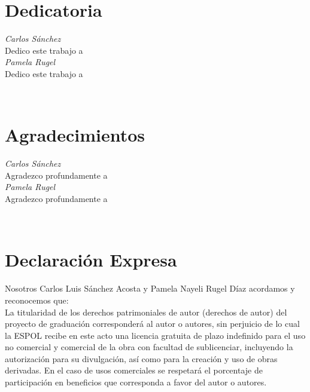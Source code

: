 \chapter*{Dedicatoria}
\thispagestyle{empty}
\begin{flushright}
    \begin{minipage}{.45\linewidth}
    \raggedright
        \textit{Carlos Sánchez}\\
        Dedico este trabajo a 
        \\[3.0em]
        
        \textit{Pamela Rugel}\\
       Dedico este trabajo a 
        
    \end{minipage}
\end{flushright}

$\ $
\thispagestyle{empty}


\chapter*{Agradecimientos}
\thispagestyle{empty}
\begin{flushright}
    \begin{minipage}{.45\linewidth}
    \raggedright
        \textit{Carlos Sánchez}\\
        Agradezco profundamente a 
        \\[3.0em]
        
        \textit{Pamela Rugel}\\
        Agradezco profundamente a 
    \end{minipage}
\end{flushright}

$\ $
\thispagestyle{empty}


\chapter*{Declaración Expresa}
\thispagestyle{empty}

Nosotros Carlos Luis Sánchez Acosta y Pamela Nayeli Rugel Díaz acordamos y reconocemos que:\\
La titularidad de los derechos patrimoniales de autor (derechos de autor) del proyecto de graduación corresponderá al autor o autores, sin perjuicio de lo cual la ESPOL recibe en este acto una licencia gratuita de plazo indefinido para el uso no comercial y comercial de la obra con facultad de sublicenciar, incluyendo la autorización para su divulgación, así como para la creación y uso de obras derivadas. En el caso de usos comerciales se respetará el porcentaje de participación en beneficios que corresponda a favor del autor o autores. 


